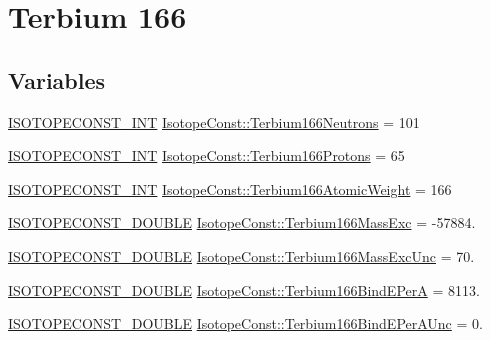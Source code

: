 \hypertarget{group___isotope_const-_terbium-_tb166}{}\section{Terbium 166}
\label{group___isotope_const-_terbium-_tb166}
\subsection*{Variables}
\begin{DoxyCompactItemize}
\item 
\mbox{\hyperlink{group___isotope_const-_macros_ga5f18360b3e99483a35c32d789e62621c}{I\+S\+O\+T\+O\+P\+E\+C\+O\+N\+S\+T\+\_\+\+I\+NT}} \mbox{\hyperlink{group___isotope_const-_terbium-_tb166_ga98547d111aa36cca2e32aa0c5e215a89}{Isotope\+Const\+::\+Terbium166\+Neutrons}} = 101
\item 
\mbox{\hyperlink{group___isotope_const-_macros_ga5f18360b3e99483a35c32d789e62621c}{I\+S\+O\+T\+O\+P\+E\+C\+O\+N\+S\+T\+\_\+\+I\+NT}} \mbox{\hyperlink{group___isotope_const-_terbium-_tb166_ga09f02423136bcb7a29e92da8b5bdeed2}{Isotope\+Const\+::\+Terbium166\+Protons}} = 65
\item 
\mbox{\hyperlink{group___isotope_const-_macros_ga5f18360b3e99483a35c32d789e62621c}{I\+S\+O\+T\+O\+P\+E\+C\+O\+N\+S\+T\+\_\+\+I\+NT}} \mbox{\hyperlink{group___isotope_const-_terbium-_tb166_gadd8dcc5ee57b5a400cae989f63278525}{Isotope\+Const\+::\+Terbium166\+Atomic\+Weight}} = 166
\item 
\mbox{\hyperlink{group___isotope_const-_macros_ga8f45a7272ce02c0b4c65c44636ed719a}{I\+S\+O\+T\+O\+P\+E\+C\+O\+N\+S\+T\+\_\+\+D\+O\+U\+B\+LE}} \mbox{\hyperlink{group___isotope_const-_terbium-_tb166_gaf43cef5b701d463909bd5b761a12f212}{Isotope\+Const\+::\+Terbium166\+Mass\+Exc}} = -\/57884.
\item 
\mbox{\hyperlink{group___isotope_const-_macros_ga8f45a7272ce02c0b4c65c44636ed719a}{I\+S\+O\+T\+O\+P\+E\+C\+O\+N\+S\+T\+\_\+\+D\+O\+U\+B\+LE}} \mbox{\hyperlink{group___isotope_const-_terbium-_tb166_ga669689840b52d76c3c37579975189f50}{Isotope\+Const\+::\+Terbium166\+Mass\+Exc\+Unc}} = 70.
\item 
\mbox{\hyperlink{group___isotope_const-_macros_ga8f45a7272ce02c0b4c65c44636ed719a}{I\+S\+O\+T\+O\+P\+E\+C\+O\+N\+S\+T\+\_\+\+D\+O\+U\+B\+LE}} \mbox{\hyperlink{group___isotope_const-_terbium-_tb166_ga1653ee851d9d50c932ca3df821eff6df}{Isotope\+Const\+::\+Terbium166\+Bind\+E\+PerA}} = 8113.
\item 
\mbox{\hyperlink{group___isotope_const-_macros_ga8f45a7272ce02c0b4c65c44636ed719a}{I\+S\+O\+T\+O\+P\+E\+C\+O\+N\+S\+T\+\_\+\+D\+O\+U\+B\+LE}} \mbox{\hyperlink{group___isotope_const-_terbium-_tb166_gaa35730192e98e0d23735d517884ef537}{Isotope\+Const\+::\+Terbium166\+Bind\+E\+Per\+A\+Unc}} = 0.

\end{DoxyCompactItemize}
